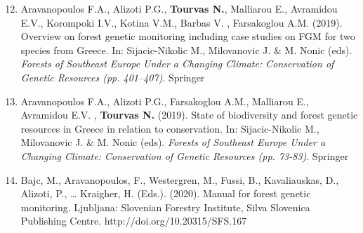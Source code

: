\documentclass[12pt,]{scrartcl}
\begin{document}
\begin{enumerate}
\setcounter{enumi}{11}
\leftskip-0.07in
\vspace{-3mm}

\item Aravanopoulos F.A., Alizoti P.G., \textbf{Tourvas N.}, Malliarou E., Avramidou E.V., Korompoki I.V., Kotina V.M., Barbas V. ,  Farsakoglou A.M. (2019). Overview on forest genetic monitoring including case studies on FGM for two species from Greece. In: Sijacic-Nikolic M., Milovanovic J. \& M. Nonic (eds). \textit{Forests of Southeast Europe Under a Changing Climate: Conservation of Genetic Resources (pp. 401–407)}. Springer


\item Aravanopoulos F.A., Alizoti P.G., Farsakoglou A.M., Malliarou E., Avramidou E.V. , \textbf{Tourvas N.}  (2019). State of biodiversity and forest genetic resources in Greece in relation to conservation. In: Sijacic-Nikolic M., Milovanovic J. \& M. Nonic (eds). \textit{Forests of Southeast Europe Under a Changing Climate: Conservation of Genetic Resources (pp. 73-83)}. Springer

\item Bajc, M., Aravanopoulos, F., Westergren, M., Fussi, B., Kavaliauskas, D., Alizoti, P., … Kraigher, H. (Eds.). (2020). Manual for forest genetic monitoring. Ljubljana: Slovenian Forestry Institute, Silva Slovenica Publishing Centre. http://doi.org/10.20315/SFS.167
\end{enumerate}




\end{document}
